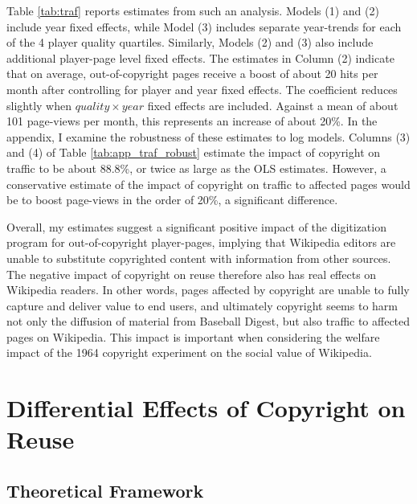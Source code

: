 \documentclass[11pt]{article}
\begin{document}
Table \ref{tab:traf} reports estimates from such an analysis. Models (1) and (2) include year fixed effects, while Model (3) includes separate year-trends for each of the 4 player quality quartiles. Similarly, Models (2) and (3) also include additional player-page level fixed effects. The estimates in Column (2) indicate that on average, out-of-copyright pages receive a boost of about 20 hits per month after controlling for player and year fixed effects. The coefficient reduces slightly when \emph{$quality \times year$} fixed effects are included. Against a mean of about 101 page-views per month, this represents an increase of about 20\%. In the appendix, I examine the robustness of these estimates to log models. Columns (3) and (4) of Table \ref{tab:app_traf_robust} estimate the impact of copyright on traffic to be about 88.8\%, or twice as large as the OLS estimates. However, a conservative estimate of the impact of copyright on traffic to affected pages would be to boost page-views in the order of 20\%, a significant difference.

Overall, my estimates suggest a significant positive impact of the digitization program for out-of-copyright player-pages, implying that Wikipedia editors are unable to substitute copyrighted content with information from other sources. The negative impact of copyright on reuse therefore also has real effects on Wikipedia readers. In other words, pages affected by copyright are unable to fully capture and deliver value to end users, and ultimately copyright seems to harm not only the diffusion of material from Baseball Digest, but also traffic to affected pages on Wikipedia. This impact is important when considering the welfare impact of the 1964 copyright experiment on the social value of Wikipedia. 

\section{Differential Effects of Copyright on Reuse}
\label{sec:hetero}


\subsection{Theoretical Framework}
\end{document}
